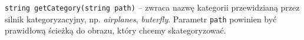 \begin{compactitem}
	\item \texttt{string getCategory(string path)} -- zwraca nazwę kategorii przewidzianą przez silnik kategoryzacyjny, np. \emph{airplanes}, \emph{buterfly}. Parametr \texttt{path} powinien być prawidłową ścieżką do obrazu, który chcemy skategoryzować.
\end{compactitem}